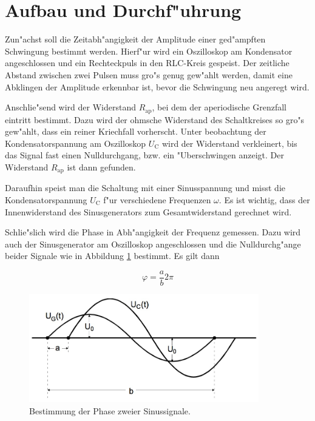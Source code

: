 \section{Aufbau und Durchf"uhrung}
	\label{sec:durchfuehrung}

	Zun"achst soll die Zeitabh"angigkeit der Amplitude einer ged"ampften Schwingung bestimmt werden.
	Hierf"ur wird ein Oszilloskop am Kondensator angeschlossen und ein Rechteckpuls in den RLC-Kreis gespeist.
	Der zeitliche Abstand zwischen zwei Pulsen muss gro"s genug gew"ahlt werden, damit eine Abklingen der Amplitude erkennbar ist, bevor die Schwingung neu angeregt wird.

	Anschlie"send wird der Widerstand $R_\mathrm{ap}$, bei dem der aperiodische Grenzfall eintritt bestimmt.
	Dazu wird der ohmsche Widerstand des Schaltkreises so gro"s gew"ahlt, dass ein reiner Kriechfall vorherscht.
	Unter beobachtung der Kondensatorspannung am Oszilloskop $U_\mathrm{C}$ wird der Widerstand verkleinert, bis das Signal fast einen Nulldurchgang, bzw. ein "Uberschwingen anzeigt.
	Der Widerstand $R_\mathrm{ap}$ ist dann gefunden.

	Daraufhin speist man die Schaltung mit einer Sinusspannung und misst die Kondensatorspannung $U_\mathrm{C}$ f"ur verschiedene Frequenzen $\omega$.
	Es ist wichtig, dass der Innenwiderstand des Sinusgenerators zum Gesamtwiderstand gerechnet wird.

	Schlie"slich wird die Phase in Abh"angigkeit der Frequenz gemessen.
	Dazu wird auch der Sinusgenerator am Oszilloskop angeschlossen und die Nulldurchg"ange beider Signale wie in Abbildung \ref{fig:phase} bestimmt.
	Es gilt dann

	\begin{equation*}
		\varphi = \frac{a}{b} 2 \pi
	\end{equation*}

	\begin{figure}[h!]
		\centering
		\includegraphics[width = 10cm]{img/phase.JPG}
		\caption{Bestimmung der Phase zweier Sinussignale. \cite{anleitung}}
		\label{fig:phase}
	\end{figure}

	\newpage